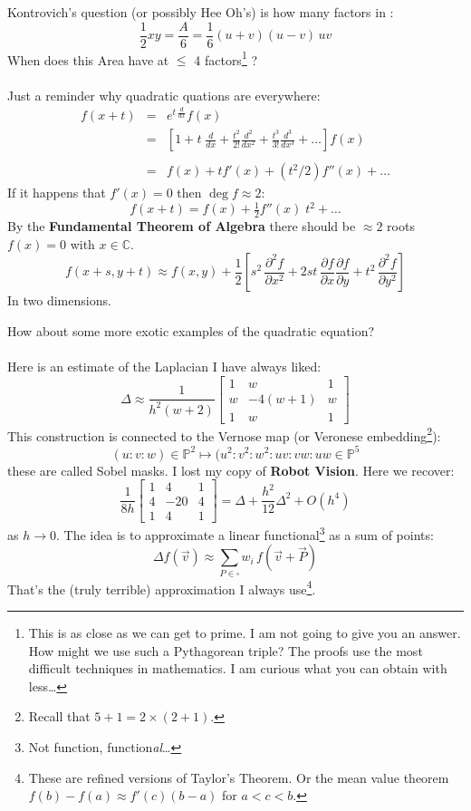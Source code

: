 \documentclass[12pt]{article}
\begin{document}
\newpage


\noindent Kontrovich's question (or possibly Hee Oh's) is how many factors in :
$$ \frac{1}{2}xy = \frac{A}{6} = \frac{1}{6}(u+v)(u-v)\, uv$$
When does this Area have at $\leq$ 4 factors\footnote{This is as close as we can get to prime. I am not going to give you an answer.  How might we use such a Pythagorean triple?  The proofs use the most difficult techniques in mathematics.  I am curious what you can obtain with less\dots} ? \\ \\
Just a reminder why quadratic quations are everywhere:
\begin{eqnarray*} f(x+t) &=& e^{t\,\frac{d}{dx}} f(x) \\ 
&=& \left[1 + t\;\frac{d}{dx} + \frac{t^2}{2!} \frac{d^2}{dx^2} + \frac{t^3}{3!} \frac{d^3}{dx^3}+ \dots \right]f(x) \\  \\
&=& f(x) + tf'(x) + (t^2/2)f''(x) + \dots \end{eqnarray*}
If it happens that $f'(x) = 0$ then $\deg f \approx 2$:
$$ f(x+t) = f(x) +  \tfrac{1}{2}f''(x)\;t^2 + \dots $$
By the \textbf{Fundamental Theorem of Algebra} there should be $\approx 2$ roots $f(x) = 0$ with $x \in \mathbb{C}$.
$$ f(x + s, y + t) \approx
f(x,y) + \frac{1}{2}\left[ 
s^2 \,\frac{\partial^2 f}{\partial x^2}+
2st \,\frac{\partial f}{\partial x}\frac{\partial f}{\partial y}+
t^2 \,\frac{\partial^2 f}{\partial y^2}
\right] $$
In two dimensions.  

\newpage

\noindent How about some more exotic examples of the quadratic equation? \\ \\
Here is an estimate of the Laplacian I have always liked:
$$ \Delta \approx \frac{1}{h^2(w+2)}
\left[ \begin{array}{ccc}
1 & w & 1 \\
w & -4(w+1) & w \\
1 & w & 1 \end{array} \right] $$
This construction is connected to the Vernose map (or Veronese embedding\footnote{Recall that $5+1 = 2 \times (2+1)$.}):
$$(u:v:w) \in \mathbb{P}^2 \mapsto (u^2 : v^2: w^2 : uv: vw: uw\in \mathbb{P}^5 $$
these are called Sobel masks.  I lost my copy of \textbf{Robot Vision}.  Here we recover:
$$
\frac{1}{8h} \left[ 
\begin{array}{ccc} 
1 & 4 & 1 \\ 4 & -20 & 4 \\ 1 & 4 & 1\end{array}
\right]
= \Delta + \frac{h^2}{12} \Delta^2 + O(h^4)
 $$
 as $h \to 0$.  The idea is to approximate a linear functional\footnote{Not function, function\textit{al}\dots} as a sum of points:
$$ \Delta f( \vec{v}) \approx 
\sum_{P \in \square } w_i \, f(\vec{v} + \vec{P}) $$
That's the (truly terrible) approximation I always use\footnote{These are refined versions of Taylor's Theorem.  Or the mean value theorem $f(b) - f(a) \approx f'(c)(b-a)$ for $a < c < b$.}. 
\end{document}
